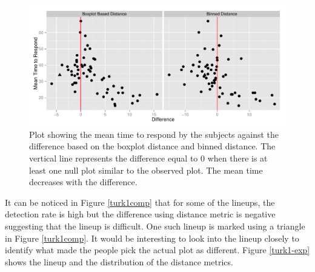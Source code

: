 \documentclass[12]{article}
\begin{document}

\begin{figure}[hbtp]
\centering
\includegraphics[scale=0.75]{turk1-mtime-box-bin.pdf}
	\vspace{-.1in}
\caption[Optional caption for list of figures]{Plot showing the mean time to respond by the subjects against the difference based on the boxplot distance and binned distance. The vertical line represents the difference equal to 0 when there is at least one null plot similar to the observed plot. The mean time decreases with the difference.  }
\label{turk1-mtime}
\end{figure}

It can be noticed in Figure \ref{turk1comp} that for some of the lineups, the detection rate is high but the difference using distance metric is negative suggesting that the lineup is difficult. One such lineup is marked using a triangle in Figure \ref{turk1comp}. It would be interesting to look into the lineup closely to identify what made the people pick the actual plot as different. Figure \ref{turk1-exp} shows the lineup and the distribution of the distance metrics. 
\end{document}
